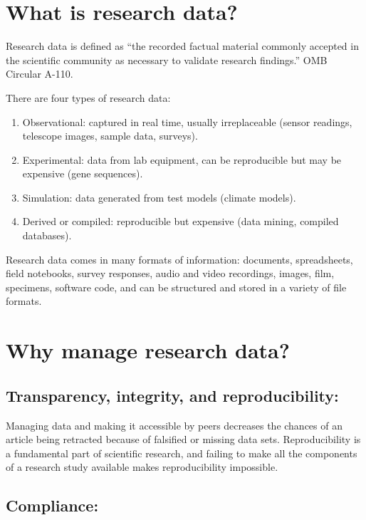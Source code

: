 \documentclass[]{article}
\begin{document}
\section{What is research data?}\label{what-is-research-data}

Research data is defined as ``the recorded factual material commonly
accepted in the scientific community as necessary to validate research
findings.'' OMB Circular A-110.

There are four types of research data:

\begin{enumerate}
\def\labelenumi{\arabic{enumi}.}
\itemsep1pt\parskip0pt
\item
  Observational: captured in real time, usually irreplaceable (sensor
  readings, telescope images, sample data, surveys).
\item
  Experimental: data from lab equipment, can be reproducible but may be
  expensive (gene sequences).
\item
  Simulation: data generated from test models (climate models).
\item
  Derived or compiled: reproducible but expensive (data mining, compiled
  databases).
\end{enumerate}

Research data comes in many formats of information: documents,
spreadsheets, field notebooks, survey responses, audio and video
recordings, images, film, specimens, software code, and can be
structured and stored in a variety of file formats.

\section{Why manage research data?}\label{why-manage-research-data}

\subsection{Transparency, integrity, and
reproducibility:}\label{transparency-integrity-and-reproducibility}

Managing data and making it accessible by peers decreases the chances of
an article being retracted because of falsified or missing data sets.
Reproducibility is a fundamental part of scientific research, and
failing to make all the components of a research study available makes
reproducibility impossible.

\subsection{Compliance:}\label{compliance}
\end{document}
